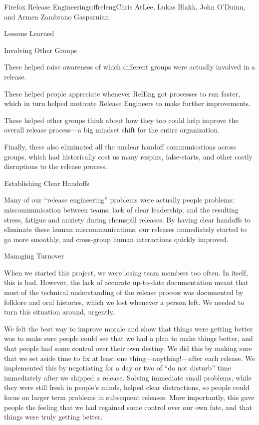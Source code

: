 \begin{aosachapter}{Firefox Release Engineering}{s:ffreleng}{Chris AtLee, Lukas Blakk, John O'Duinn, and Armen Zambrano Gasparnian}
\begin{aosasect1}{Lessons Learned}
\begin{aosasect2}{Involving Other Groups}
\begin{aosaitemize}
\item These helped raise awareness of which different groups were actually
involved in a release.
\item These helped people appreciate whenever RelEng got processes to run
faster, which in turn helped motivate Release Engineers to make further
improvements.
\item These helped other groups think about how they too could help improve the
overall release process---a big mindset shift for the entire organization.
\item Finally, these also eliminated all the unclear handoff communications
across groups, which had historically cost us many respins, false-starts, and
other costly disruptions to the release process.
\end{aosaitemize}

\end{aosasect2}

\begin{aosasect2}{Establishing Clear Handoffs}

Many of our ``release engineering'' problems were actually people problems:
miscommunication between teams; lack of clear leadership; and the resulting stress, fatigue
and anxiety during chemspill releases. By having clear handoffs to eliminate
these human miscommunications, our releases immediately started to go more
smoothly, and cross-group human interactions quickly improved.

\end{aosasect2}

\begin{aosasect2}{Managing Turnover}

When we started this project, we were losing team members too often. In itself,
this is bad. However, the lack of accurate up-to-date documentation meant that
most of the technical understanding of the release process was documented by
folklore and oral histories, which we lost whenever a person left. We needed to
turn this situation around, urgently.

We felt the best way to improve morale and show that things were getting better
was to make sure people could see that we had a plan to make things better, and
that people had some control over their own destiny. We did this by making sure
that we set aside time to fix at least one thing---anything!---after each
release. We implemented this by negotiating for a day or two of ``do not disturb''
time immediately after we shipped a release. Solving immediate small problems,
while they were still fresh in people's minds, helped clear distractions, so
people could focus on larger term problems in subsequent releases. More
importantly, this gave people the feeling that we had regained some control
over our own fate, and that things were truly getting better.


\end{aosasect2}
\end{aosasect1}
\end{aosachapter}
